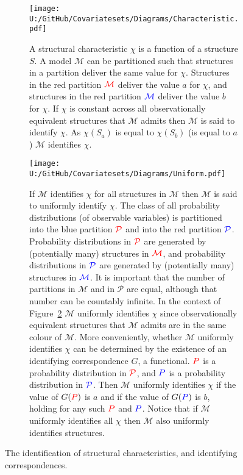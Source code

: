 \documentclass[10pt,a4paper,twoside]{article}
\numberwithin{equation}{section}
\begin{document}
\begin{figure}[p]
\centering
\begin{subfigure}{0.8\textwidth}
  \centering
  \texttt{[image: U:/GitHub/Covariatesets/Diagrams/Characteristic.pdf]}
  \caption{A structural characteristic $\chi$ is a function of a structure $S$. A model $\mathcal{M}$ can be partitioned such that structures in a partition deliver the same value for $\chi$. Structures in the red partition $\color{red}\mathcal{M}$ deliver the value $a$ for $\chi$, and structures in the red partition $\color{blue}\mathcal{M}$ deliver the value $b$ for $\chi$. If $\chi$ is constant across all observationally equivalent structures that $\mathcal{M}$ admits then $\mathcal{M}$ is said to identify $\chi$. As $\chi(S_a)$ is equal to $\chi(S_b)$ (is equal to $a$) $\mathcal{M}$ identifies $\chi$.}
  \label{fig:characteristic}
  \end{subfigure}
  \begin{subfigure}{0.8\textwidth}
  \centering
  \texttt{[image: U:/GitHub/Covariatesets/Diagrams/Uniform.pdf]}
  \caption{If $\mathcal{M}$ identifies $\chi$ for all structures in $\mathcal{M}$ then $\mathcal{M}$ is said to uniformly identify $\chi$. The class of all probability distributions (of observable variables) is partitioned into the blue partition $\color{red}\mathcal{P}$ and into the red partition $\color{blue}\mathcal{P}$. Probability distributions in $\color{red}\mathcal{P}$ are generated by (potentially many) structures in $\color{red}\mathcal{M}$, and probability distributions in $\color{blue}\mathcal{P}$ are generated by (potentially many) structures in $\color{blue}\mathcal{M}$. It is important that the number of partitions in $\mathcal{M}$ and in $\mathcal{P}$ are equal, although that number can be countably infinite. In the context of Figure~\ref{fig:uniform} $\mathcal{M}$ uniformly identifies $\chi$ since observationally equivalent structures that $\mathcal{M}$ admits are in the same colour of $\mathcal{M}$. More conveniently, whether $\mathcal{M}$ uniformly identifies $\chi$ can be determined by the existence of an identifying correspondence $G$, a functional. $\color{red}P$ is a probability distribution in $\color{red}\mathcal{P}$, and $\color{blue}P$ is a probability distribution in $\color{blue}\mathcal{P}$. Then $\mathcal{M}$ uniformly identifies $\chi$ if the value of $G(\color{red}P\color{black})$ is $a$ and if the value of $G(\color{blue}P\color{black})$ is $b$, holding for any such $\color{red}P$ and $\color{blue}P$. Notice that if $\mathcal{M}$ uniformly identifies all $\chi$ then $\mathcal{M}$ also uniformly identifies structures.}
  \label{fig:uniform}
  \end{subfigure}
  \caption{The identification of structural characteristics, and identifying correspondences.}
  \label{fig:characteristics}
\end{figure}
\end{document}
